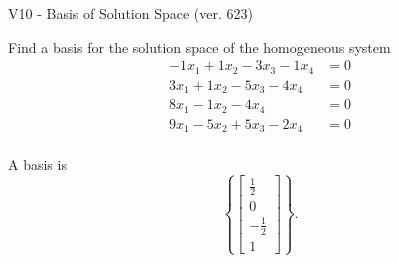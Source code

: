 \begin{exercise}
  \begin{exerciseTitle}V10 - Basis of Solution Space (ver. 623)\end{exerciseTitle}
  \begin{exerciseStatement}
    Find a basis for the solution space of the homogeneous system 
\begin{align*}
 -1 x_ 1 + 1 x_ 2 -3 x_ 3 -1 x_ 4 &= 0  \\ 
  3 x_ 1 + 1 x_ 2 -5 x_ 3 -4 x_ 4 &= 0  \\ 
  8 x_ 1 -1 x_ 2 -4 x_ 4 &= 0  \\ 
  9 x_ 1 -5 x_ 2 + 5 x_ 3 -2 x_ 4 &= 0  \\ 
 \end{align*}


 
  \end{exerciseStatement}

  \begin{exerciseAnswer}
   A basis is   
\[\left\{\left[\begin{array}{c}
\frac{1}{2} \\
0 \\
-\frac{1}{2} \\
1
\end{array}\right]\right\}.\]

  


  \end{exerciseAnswer}
\end{exercise}